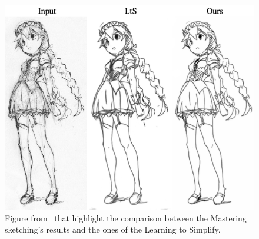 \begin{figure}[!ht]
\centering
  \includegraphics[scale=0.35]{figures/masteringSketchinResult.png}
  \caption{Figure from~\cite{masteringSketching} that highlight the comparison between the Mastering sketching's results and the ones of the Learning to Simplify.}
  \label{fig:Mastering sketching results}
\end{figure}

